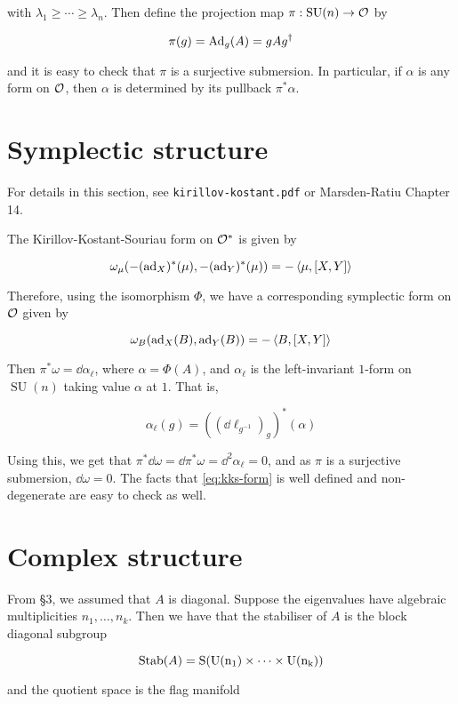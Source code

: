 \documentclass{article}
\DeclareMathOperator{\SU}{SU}
\begin{document}
with \(\lambda_1 \ge \cdots \ge \lambda_n\). Then define the projection map \(\pi : \SU(n) \to \mcO\) by

\[\pi(g) = \operatorname{Ad}_g(A) = gAg^\dagger\]

and it is easy to check that \(\pi\) is a surjective submersion. In particular, if \(\alpha\) is any form on \(\mathcal{O}\), then \(\alpha\) is determined by its pullback \(\pi^*\alpha\).

\section{Symplectic structure}

For details in this section, see \texttt{kirillov-kostant.pdf} or Marsden-Ratiu Chapter 14.

The Kirillov-Kostant-Souriau form on \(\mathcal{O}^*\) is given by

\[\omega_\mu(-(\operatorname{ad}_X)^*(\mu), -(\operatorname{ad}_Y)^*(\mu)) = -\left\langle \mu, [X, Y] \right\rangle\]

Therefore, using the isomorphism \(\Phi\), we have a corresponding symplectic form on \(\mathcal{O}\) given by

\begin{equation}
    \label{eq:kks-form}
    \omega_B(\operatorname{ad}_X(B), \operatorname{ad}_Y(B)) = -\left\langle B, [X, Y] \right\rangle
\end{equation}

Then \(\pi^*\omega = \dd\alpha_\ell\), where \(\alpha = \Phi(A)\), and \(\alpha_\ell\) is the left-invariant \(1\)-form on \(\SU(n)\) taking value \(\alpha\) at \(1\). That is,

\[\alpha_\ell(g) = ((\dd\ell_{g^{-1}})_g)^*(\alpha)\]

Using this, we get that \(\pi^*\dd\omega = \dd\pi^*\omega = \dd^2\alpha_\ell = 0\), and as \(\pi\) is a surjective submersion, \(\dd\omega = 0\). The facts that \cref{eq:kks-form} is well defined and non-degenerate are easy to check as well.

\section{Complex structure}

From \S 3, we assumed that \(A\) is diagonal. Suppose the eigenvalues have algebraic multiplicities \(n_1, \dots, n_k\). Then we have that the stabiliser of \(A\) is the block diagonal subgroup

\[\operatorname{Stab}(A) = \rm S(\rm U(n_1) \times \cdots \times \rm U(n_k))\]

and the quotient space is the flag manifold
\end{document}
